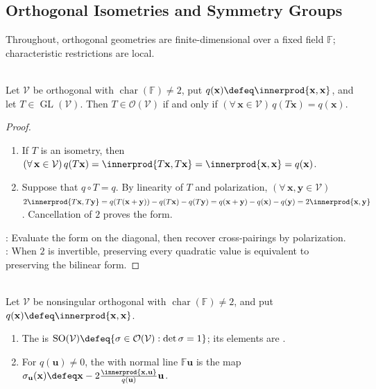 \subsection{Orthogonal Isometries and Symmetry Groups}

Throughout, orthogonal geometries are finite-dimensional over a fixed field $\mathbb{F}$; characteristic restrictions are local.

\begin{proposition} \label{prop:orthogonal-isometry-preserves-quadratic-form} \\
Let $\mathcal{V}$ be orthogonal with $\operatorname{char}(\mathbb{F})\neq2$, put $q(\mathbf{x})\defeq\innerprod{\mathbf{x},\mathbf{x}}$, and let $T\in\operatorname{GL}(\mathcal{V})$. Then $T\in\mathcal{O}(\mathcal{V})$ if and only if $(\forall\,\mathbf{x}\in\mathcal{V})\,q(T\mathbf{x})=q(\mathbf{x})$.
\begin{proof}
\begin{enumerate}[label=\roman*.]
\setlength{\itemsep}{0pt}
\item[$(\Rightarrow)$] If $T$ is an isometry, then $(\forall\,\mathbf{x}\in\mathcal{V})\,q(T\mathbf{x})=\innerprod{T\mathbf{x},T\mathbf{x}}=\innerprod{\mathbf{x},\mathbf{x}}=q(\mathbf{x})$.
\item[$(\Leftarrow)$] Suppose that $q\circ T=q$. By linearity of $T$ and polarization, $(\forall\,\mathbf{x},\mathbf{y}\in\mathcal{V})$\\
$2\innerprod{T\mathbf{x},T\mathbf{y}}=q(T(\mathbf{x}+\mathbf{y}))-q(T\mathbf{x})-q(T\mathbf{y})=q(\mathbf{x}+\mathbf{y})-q(\mathbf{x})-q(\mathbf{y})=2\innerprod{\mathbf{x},\mathbf{y}}$. Cancellation of $2$ proves the form.
\end{enumerate}
: Evaluate the form on the diagonal, then recover cross-pairings by polarization.\\
: When $2$ is invertible, preserving every quadratic value is equivalent to preserving the bilinear form.
\end{proof}
\end{proposition}

\begin{definition} \label{def:orthogonal-symmetry-rotation-reflection} \\
Let $\mathcal{V}$ be nonsingular orthogonal with $\operatorname{char}(\mathbb{F})\neq2$, and put $q(\mathbf{x})\defeq\innerprod{\mathbf{x},\mathbf{x}}$.
\begin{enumerate}[label=(\roman*)]
\setlength{\itemsep}{0pt}
\item The  is $\operatorname{SO}(\mathcal{V})\defeq\{\sigma\in\mathcal{O}(\mathcal{V}):\det\sigma=1\}$; its elements are .
\item For $q(\mathbf{u})\neq0$, the  with normal line $\mathbb{F}\mathbf{u}$ is the map $\sigma_{\mathbf{u}}(\mathbf{x})\defeq\mathbf{x}-2\frac{\innerprod{\mathbf{x},\mathbf{u}}}{q(\mathbf{u})}\mathbf{u}$.
\end{enumerate}
\end{definition}

